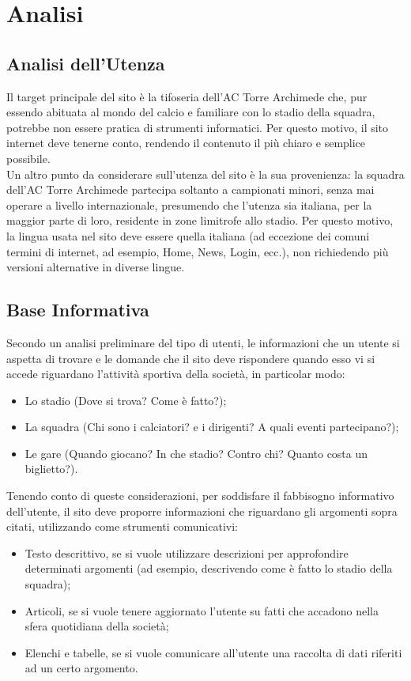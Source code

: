 \section{Analisi}
    \subsection{Analisi dell'Utenza}
    Il target principale del sito è la tifoseria dell'AC Torre Archimede che, pur essendo abituata al mondo del calcio e familiare con lo stadio della squadra, potrebbe non essere pratica di strumenti informatici. Per questo motivo, il sito internet deve tenerne conto, rendendo il contenuto il più chiaro e semplice possibile.\\
    Un altro punto da considerare sull'utenza del sito è la sua provenienza: la squadra dell'AC Torre Archimede partecipa soltanto a campionati minori, senza mai operare a livello internazionale, presumendo che l'utenza sia italiana, per la maggior parte di loro, residente in zone limitrofe allo stadio. Per questo motivo, la lingua usata nel sito deve essere quella italiana (ad eccezione dei comuni termini di internet, ad esempio, Home, News, Login, ecc.), non richiedendo più versioni alternative in diverse lingue.

    \subsection{Base Informativa}
    Secondo un analisi preliminare del tipo di utenti, le informazioni che un utente si aspetta di trovare e le domande che il sito deve rispondere quando esso vi si accede riguardano l'attività sportiva della società, in particolar modo:
    
    \begin{itemize}
        \item Lo stadio (Dove si trova? Come è fatto?);
        \item La squadra (Chi sono i calciatori? e i dirigenti? A quali eventi partecipano?);
        \item Le gare (Quando giocano? In che stadio? Contro chi? Quanto costa un biglietto?).
    \end{itemize}
    
    \noindent
    Tenendo conto di queste considerazioni, per soddisfare il fabbisogno informativo dell'utente, il sito deve proporre informazioni che riguardano gli argomenti sopra citati, utilizzando come strumenti comunicativi:
    
    \begin{itemize}
        \item Testo descrittivo, se si vuole utilizzare descrizioni per approfondire determinati argomenti (ad esempio, descrivendo come è fatto lo stadio della squadra);
        \item Articoli, se si vuole tenere aggiornato l'utente su fatti che accadono nella sfera quotidiana della società;
        \item Elenchi e tabelle, se si vuole comunicare all'utente una raccolta di dati riferiti ad un certo argomento.
    \end{itemize}


